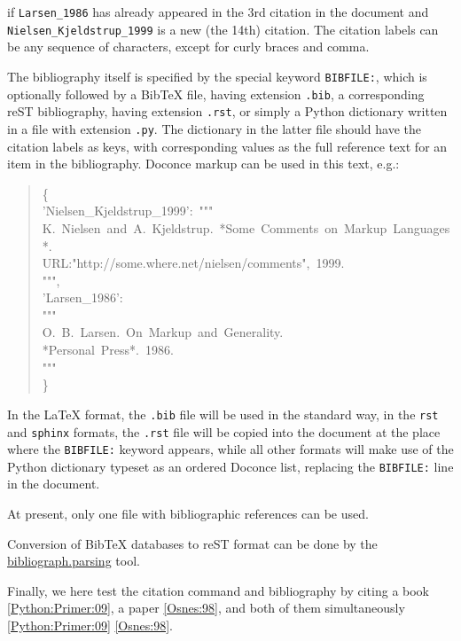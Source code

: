 \documentclass[a4paper]{article}
\begin{document}
if \texttt{Larsen\_1986} has already appeared in the 3rd citation in the document
and \texttt{Nielsen\_Kjeldstrup\_1999} is a new (the 14th) citation. The citation labels
can be any sequence of characters, except for curly braces and comma.

The bibliography itself is specified by the special keyword \texttt{BIBFILE:},
which is optionally followed by a BibTeX file, having extension \texttt{.bib},
a corresponding reST bibliography, having extension \texttt{.rst},
or simply a Python dictionary written in a file with extension \texttt{.py}.
The dictionary in the latter file should have the citation labels as
keys, with corresponding values as the full reference text for an item
in the bibliography. Doconce markup can be used in this text, e.g.:
%
\begin{quote}{\ttfamily \raggedright \noindent
\{\\
'Nielsen\_Kjeldstrup\_1999':~"{}"{}"\\
K.~Nielsen~and~A.~Kjeldstrup.~*Some~Comments~on~Markup~Languages*.\\
URL:"http://some.where.net/nielsen/comments",~1999.\\
"{}"{}",\\
'Larsen\_1986':\\
"{}"{}"\\
O.~B.~Larsen.~On~Markup~and~Generality.\\
*Personal~Press*.~1986.\\
"{}"{}"\\
\}
}
\end{quote}

In the LaTeX format, the \texttt{.bib} file will be used in the standard way,
in the \texttt{rst} and \texttt{sphinx} formats, the \texttt{.rst} file will be
copied into the document at the place where the \texttt{BIBFILE:} keyword
appears, while all other formats will make use of the Python dictionary
typeset as an ordered Doconce list, replacing the \texttt{BIBFILE:} line
in the document.

At present, only one file with bibliographic references can be used.



Conversion of BibTeX databases to reST format can be
done by the \href{http://pypi.python.org/pypi/bibliograph.parsing/}{bibliograph.parsing} tool.

Finally, we here test the citation command and bibliography by
citing a book \hyperlink{python-primer-09}{[Python:Primer:09]}, a paper \hyperlink{osnes-98}{[Osnes:98]},
and both of them simultaneously \hyperlink{python-primer-09}{[Python:Primer:09]} \hyperlink{osnes-98}{[Osnes:98]}.
\end{document}

